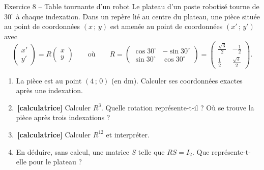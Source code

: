 \documentclass[a4paper,11pt]{article}
\newcommand{\M}[1]{\begin{pmatrix}#1\end{pmatrix}}
\newcommand{\calc}{\,{\color{uimmred}\small\textbf{[calculatrice]}}}
\begin{document}
\begin{exo}{Exercice 8 -- Table tournante d'un robot}
\label{exo:8}
Le plateau d'un poste robotisé tourne de $30^\circ$ à chaque indexation. Dans un repère lié au centre du plateau, une pièce située au point de coordonnées $(x\,;\,y)$ est amenée au point de coordonnées $(x'\,;\,y')$ avec
\[
\M{x'\\y'} = R\M{x\\y}
\qquad\text{où}\qquad
R = \M{\cos 30^\circ & -\sin 30^\circ\\ \sin 30^\circ & \cos 30^\circ} = \M{\frac{\sqrt 3}{2} & -\frac{1}{2}\\[2pt] \frac{1}{2} & \frac{\sqrt 3}{2}}.
\]
\begin{enumerate}[label=\alph*)]
  \item La pièce est au point $(4\,;\,0)$ (en dm). Calculer ses coordonnées exactes après une indexation.
  \item \calc{} Calculer $R^3$. Quelle rotation représente-t-il ? Où se trouve la pièce après trois indexations ?
  \item \calc{} Calculer $R^{12}$ et interpréter.
  \item En déduire, sans calcul, une matrice $S$ telle que $RS = I_2$. Que représente-t-elle pour le plateau ?
\end{enumerate}
\end{exo}
\end{document}
